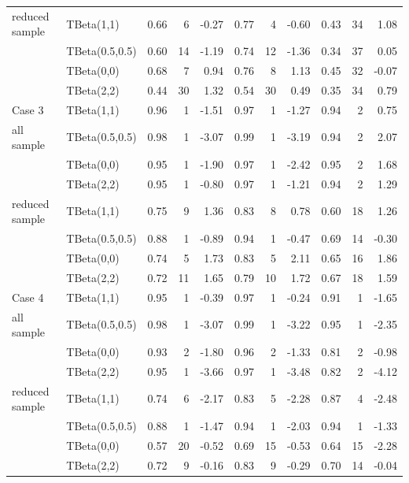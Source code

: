 \documentclass{amsart}
\begin{document}
\begin{table}[ht]
{\begin{tabular}{ll|crr|crr|crr}
		\midrule
		reduced sample & TBeta(1,1) & 0.66 & 6 & -0.27 & 0.77 & 4 & -0.60 & 0.43 & 34 & 1.08 \\ 
		& TBeta(0.5,0.5) & 0.60 & 14 & -1.19 & 0.74 & 12 & -1.36 & 0.34 & 37 & 0.05 \\ 
		& TBeta(0,0) & 0.68 & 7 & 0.94 & 0.76 & 8 & 1.13 & 0.45 & 32 & -0.07 \\ 
		& TBeta(2,2) & 0.44 & 30 & 1.32 & 0.54 & 30 & 0.49 & 0.35 & 34 & 0.79 \\ 
		\midrule
		Case 3 & TBeta(1,1) & 0.96 & 1 & -1.51 & 0.97 & 1 & -1.27 & 0.94 & 2 & 0.75 \\ 
		all sample & TBeta(0.5,0.5) & 0.98 & 1 & -3.07 & 0.99 & 1 & -3.19 & 0.94 & 2 & 2.07 \\ 
		& TBeta(0,0) & 0.95 & 1 & -1.90 & 0.97 & 1 & -2.42 & 0.95 & 2 & 1.68 \\ 
		& TBeta(2,2) & 0.95 & 1 & -0.80 & 0.97 & 1 & -1.21 & 0.94 & 2 & 1.29 \\ 
		\midrule
		reduced sample & TBeta(1,1) & 0.75 & 9 & 1.36 & 0.83 & 8 & 0.78 & 0.60 & 18 & 1.26 \\ 
		& TBeta(0.5,0.5) & 0.88 & 1 & -0.89 & 0.94 & 1 & -0.47 & 0.69 & 14 & -0.30 \\ 
		& TBeta(0,0) & 0.74 & 5 & 1.73 & 0.83 & 5 & 2.11 & 0.65 & 16 & 1.86 \\ 
		& TBeta(2,2) & 0.72 & 11 & 1.65 & 0.79 & 10 & 1.72 & 0.67 & 18 & 1.59 \\ 
		\midrule
		Case 4 & TBeta(1,1) & 0.95 & 1 & -0.39 & 0.97 & 1 & -0.24 & 0.91 & 1 & -1.65 \\ 
		all sample & TBeta(0.5,0.5) & 0.98 & 1 & -3.07 & 0.99 & 1 & -3.22 & 0.95 & 1 & -2.35 \\ 
		& TBeta(0,0) & 0.93 & 2 & -1.80 & 0.96 & 2 & -1.33 & 0.81 & 2 & -0.98 \\ 
		& TBeta(2,2) & 0.95 & 1 & -3.66 & 0.97 & 1 & -3.48 & 0.82 & 2 & -4.12 \\ 
		\midrule
		reduced sample & TBeta(1,1) & 0.74 & 6 & -2.17 & 0.83 & 5 & -2.28 & 0.87 & 4 & -2.48 \\ 
		& TBeta(0.5,0.5) & 0.88 & 1 & -1.47 & 0.94 & 1 & -2.03 & 0.94 & 1 & -1.33 \\ 
		& TBeta(0,0) & 0.57 & 20 & -0.52 & 0.69 & 15 & -0.53 & 0.64 & 15 & -2.28 \\ 
		& TBeta(2,2) & 0.72 & 9 & -0.16 & 0.83 & 9 & -0.29 & 0.70 & 14 & -0.04 \\ 
		\bottomrule
		\end{tabular}}
\end{table}
\end{document}
